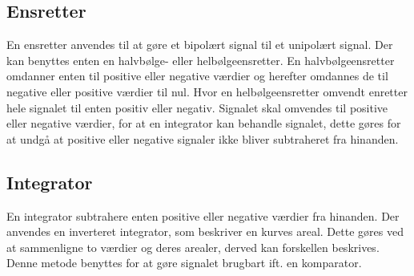\subsection{Ensretter}
En ensretter anvendes til at gøre et bipolært signal til et unipolært signal. Der kan benyttes enten en halvbølge- eller helbølgeensretter. En halvbølgeensretter omdanner enten til positive eller negative værdier og herefter omdannes de til negative eller positive værdier til nul. Hvor en helbølgeensretter omvendt enretter hele signalet til enten positiv eller negativ. 
Signalet skal omvendes til positive eller negative værdier, for at en integrator kan behandle signalet, dette gøres for at undgå at positive eller negative signaler ikke bliver subtraheret fra hinanden.

\subsection{Integrator}
En integrator subtrahere enten positive eller negative værdier fra hinanden. Der anvendes en inverteret integrator, som beskriver en kurves areal. Dette gøres ved at sammenligne to værdier og deres arealer, derved kan forskellen beskrives. 
Denne metode benyttes for at gøre signalet brugbart ift. en komparator.

